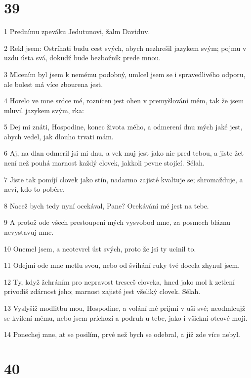 \chapter{39}

\par 1 Prednímu zpeváku Jedutunovi, žalm Daviduv.
\par 2 Rekl jsem: Ostríhati budu cest svých, abych nezhrešil jazykem svým; pojmu v uzdu ústa svá, dokudž bude bezbožník prede mnou.
\par 3 Mlcením byl jsem k nemému podobný, umlcel jsem se i spravedlivého odporu, ale bolest má více zbourena jest.
\par 4 Horelo ve mne srdce mé, roznícen jest ohen v premyšlování mém, tak že jsem mluvil jazykem svým, rka:
\par 5 Dej mi znáti, Hospodine, konec života mého, a odmerení dnu mých jaké jest, abych vedel, jak dlouho trvati mám.
\par 6 Aj, na dlan odmeril jsi mi dnu, a vek muj jest jako nic pred tebou, a jiste žet není než pouhá marnost každý clovek, jakkoli pevne stojící. Sélah.
\par 7 Jiste tak pomíjí clovek jako stín, nadarmo zajisté kvaltuje se; shromažduje, a neví, kdo to pobére.
\par 8 Nacež bych tedy nyní ocekával, Pane? Ocekávání mé jest na tebe.
\par 9 A protož ode všech prestoupení mých vysvobod mne, za posmech bláznu nevystavuj mne.
\par 10 Onemel jsem, a neotevrel úst svých, proto že jsi ty ucinil to.
\par 11 Odejmi ode mne metlu svou, nebo od švihání ruky tvé docela zhynul jsem.
\par 12 Ty, když žehráním pro nepravost tresceš cloveka, hned jako mol k zetlení privodíš zdárnost jeho; marnost zajisté jest všeliký clovek. Sélah.
\par 13 Vyslyšiž modlitbu mou, Hospodine, a volání mé prijmi v uši své; neodmlcujž se kvílení mému, nebo jsem príchozí a podruh u tebe, jako i všickni otcové moji.
\par 14 Ponechej mne, at se posilím, prvé než bych se odebral, a již zde více nebyl.

\chapter{40}

